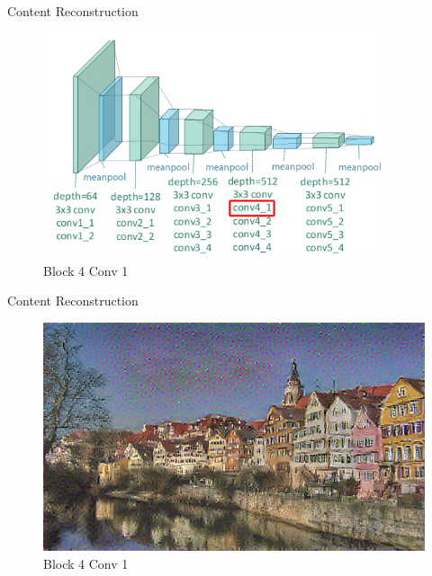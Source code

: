 \documentclass{beamer}
\begin{document}
\begin{frame}{Content Reconstruction}
\begin{figure}[ht]
\centering
\includegraphics[width=0.9\textwidth]{img/vgg19/content/block4_conv1}
\caption{Block 4 Conv 1}
\end{figure}
\end{frame}
\begin{frame}{Content Reconstruction}
\begin{figure}[ht]
\centering
\includegraphics[width=\textwidth]{img/content/block4_conv1.png}
\caption{Block 4 Conv 1}
\end{figure}
\end{frame}
\end{document}
